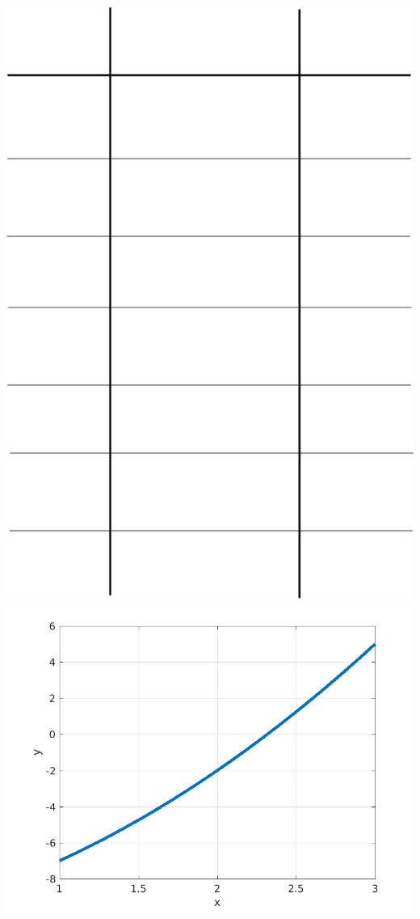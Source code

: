 \documentclass[11pt]{article}
\begin{document}
\begin{itemize}
\begin{itemize}
			 \hspace{20mm}\vspace{20mm}\\
		\end{itemize}
			\includegraphics[scale=.3]{lecture1_fig4.png}
			\includegraphics[scale=.8]{lecture1_fig3.png}


\end{itemize}
\end{document}
